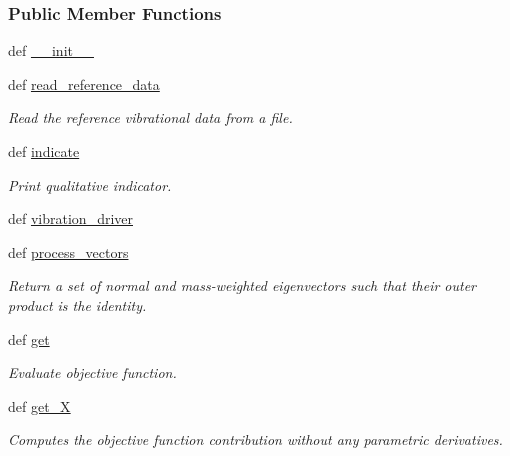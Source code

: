 \subsubsection*{Public Member Functions}
\begin{DoxyCompactItemize}
\item 
def \hyperlink{classforcebalance_1_1tinkerio_1_1Vibration__TINKER_a4f4dcaa18b29ae9dd69e6c0a60e40b09}{\-\_\-\-\_\-init\-\_\-\-\_\-}
\item 
def \hyperlink{classforcebalance_1_1vibration_1_1Vibration_ad3fc1fdf6452b11933d234b46b07071d}{read\-\_\-reference\-\_\-data}
\begin{DoxyCompactList}\small\item\em Read the reference vibrational data from a file. \end{DoxyCompactList}\item 
def \hyperlink{classforcebalance_1_1vibration_1_1Vibration_a1f13ce8796e3d089c9a361f43844bb98}{indicate}
\begin{DoxyCompactList}\small\item\em Print qualitative indicator. \end{DoxyCompactList}\item 
def \hyperlink{classforcebalance_1_1vibration_1_1Vibration_afa414133f30a224687fcd34eca008744}{vibration\-\_\-driver}
\item 
def \hyperlink{classforcebalance_1_1vibration_1_1Vibration_a5365302b992fdb2656aa2bc0bb6c6079}{process\-\_\-vectors}
\begin{DoxyCompactList}\small\item\em Return a set of normal and mass-\/weighted eigenvectors such that their outer product is the identity. \end{DoxyCompactList}\item 
def \hyperlink{classforcebalance_1_1vibration_1_1Vibration_a3b20f6a97f3aba4f704056ed12a999a5}{get}
\begin{DoxyCompactList}\small\item\em Evaluate objective function. \end{DoxyCompactList}\item 
def \hyperlink{classforcebalance_1_1target_1_1Target_a606dd136f195c267c05a2455405e5949}{get\-\_\-\-X}
\begin{DoxyCompactList}\small\item\em Computes the objective function contribution without any parametric derivatives. \end{DoxyCompactList}\item 

\end{DoxyCompactItemize}

